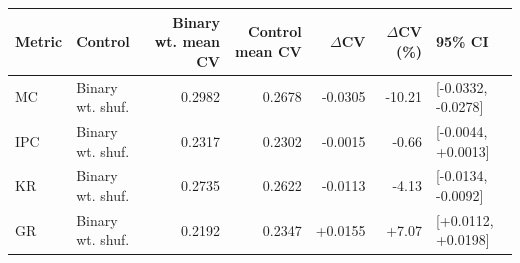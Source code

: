 \begin{tabular}{llrrrrl}
\toprule
Metric & Control & Binary wt. mean CV & Control mean CV & $\Delta$CV & $\Delta$CV (\%) & 95\% CI \\
\midrule
MC & Binary wt. shuf. & 0.2982 & 0.2678 & -0.0305 & -10.21 & [-0.0332, -0.0278] \\
IPC & Binary wt. shuf. & 0.2317 & 0.2302 & -0.0015 & -0.66 & [-0.0044, +0.0013] \\
KR & Binary wt. shuf. & 0.2735 & 0.2622 & -0.0113 & -4.13 & [-0.0134, -0.0092] \\
GR & Binary wt. shuf. & 0.2192 & 0.2347 & +0.0155 & +7.07 & [+0.0112, +0.0198] \\
\bottomrule
\end{tabular}
